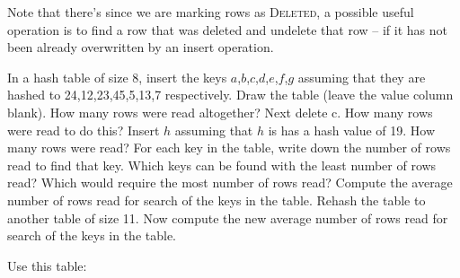 Note that there's since we are marking rows as \textsc{Deleted},
a possible useful operation is to find a row that was deleted
and undelete that row -- if it has not been already overwritten
by an insert operation.

\begin{ex}
  In a hash table of size 8, insert the keys
  $a$,$b$,$c$,$d$,$e$,$f$,$g$
  assuming that they are hashed to
  24,12,23,45,5,13,7 respectively.
  Draw the table (leave the value column blank).
  How many rows were read altogether?
  Next delete c. How many rows were read to do this?
  Insert $h$ assuming that $h$ is has a hash value of 19.
  How many rows were
  read?
  For each key in the table,
  write down the number of rows read to find
  that key.
  Which keys can be found with the least number of
  rows read?
  Which would require the most number of rows read?
  Compute the average number of rows read for search of the keys in the table.
  Rehash the table to another table of size 11.
  Now compute the new
  average number of rows read for search of the keys in the table.
\end{ex}

Use this table:


